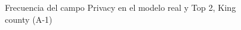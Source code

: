 \begin{figure}[H]
    \centering
    
    \caption{Frecuencia del campo Privacy en el modelo real y Top 2, King county (A-1)}
    \label{frecuency-top2-privacy}
\end{figure}